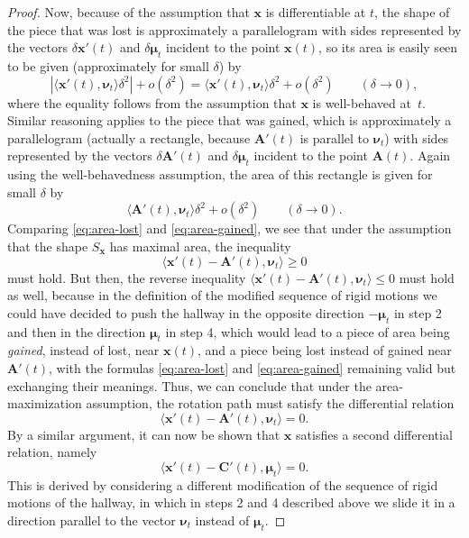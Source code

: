 \documentclass[11pt]{article}
\newcommand{\nvecone}{\boldsymbol{\mu}}
\newcommand{\nvectwo}{\boldsymbol{\nu}}
\begin{document}
\begin{proof}
Now, because of the assumption that $\mathbf{x}$ is differentiable at $t$, the shape of the piece that was lost is 
approximately a parallelogram with sides represented by the vectors $\delta \mathbf{x}'(t)$ and $\delta \nvecone_t$ incident to the point $\mathbf{x}(t)$, so its area is easily seen to be given (approximately for small $\delta$) by
\begin{equation}
\label{eq:area-lost}
\left|\Big\langle \mathbf{x}'(t), \nvectwo_t \Big\rangle \delta^2\right| + o(\delta^2) = 
\Big\langle \mathbf{x}'(t), \nvectwo_t \Big\rangle \delta^2 + o(\delta^2) \qquad (\delta \to 0),
\end{equation}
where the equality follows from the assumption that $\mathbf{x}$ is well-behaved at~$t$.
Similar reasoning applies to the piece that was gained, which is approximately a parallelogram (actually a rectangle, because $\mathbf{A}'(t)$ is parallel to $\nvectwo_t$) with sides represented by the vectors $\delta \mathbf{A}'(t)$ and $\delta \nvecone_t$ incident to the point $\mathbf{A}(t)$. Again using the well-behavedness assumption, the area of this rectangle is given for small $\delta$ by
\begin{equation}
\label{eq:area-gained}
 \Big\langle \mathbf{A}'(t), \nvectwo_t \Big\rangle \delta^2 + o(\delta^2) \qquad (\delta \to 0).
 \end{equation}
Comparing \eqref{eq:area-lost} and \eqref{eq:area-gained},  we see that under the assumption that the shape $S_\mathbf{x}$ has maximal area, the inequality
$$
\Big\langle \mathbf{x}'(t) - \mathbf{A}'(t), \nvectwo_t \Big\rangle  \ge 0
$$
must hold. But then, the reverse inequality $\langle \mathbf{x}'(t) - \mathbf{A}'(t), \nvectwo_t \rangle  \le 0$ must hold as well, because in the definition of the modified sequence of rigid motions we could have decided to push the hallway in the opposite direction $-\nvecone_t$ in step 2 and then in the direction $\nvecone_t$ in step 4, which would lead to a piece of area being \emph{gained}, instead of lost, near $\mathbf{x}(t)$, and a piece being lost instead of gained near $\mathbf{A}'(t)$, with the formulas \eqref{eq:area-lost} and \eqref{eq:area-gained} remaining valid but exchanging their meanings. Thus, we can conclude that under the area-maximization assumption, the rotation path must satisfy the differential 
relation
\begin{equation} \label{eq:differential-relation1}
\Big\langle \mathbf{x}'(t) - \mathbf{A}'(t), \nvectwo_t \Big\rangle  = 0.
\end{equation}
By a similar argument, it can now be shown that $\mathbf{x}$ satisfies a second differential relation, 
namely
\begin{equation} \label{eq:differential-relation2}
\Big\langle \mathbf{x}'(t) - \mathbf{C}'(t), \nvecone_t \Big\rangle  = 0.
\end{equation}
This is derived by considering a different modification of the sequence of rigid motions of the hallway, in which in steps 2 and 4 described above we slide it in a direction parallel to the vector $\nvectwo_t$ instead of $\nvecone_t$.


\end{proof}
\end{document}
